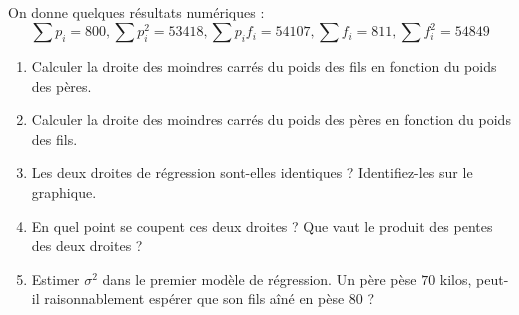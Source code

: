 \documentclass{../headers/td_upc}
\providecommand{\1}{\mathds{1}}
\begin{document}
	On donne quelques résultats numériques :
	$$
	\sum p_{i}=800, \sum p_{i}^{2}=53418, \sum p_{i} f_{i}=54107, \sum f_{i}=811, \sum f_{i}^{2}=54849
	$$
	\begin{enumerate}
		\item  Calculer la droite des moindres carrés du poids des fils en fonction du poids des pères.
		\cor{
		\[
		\hat \beta_1 
		= \frac{\sum_{i=1}^n (f_i - \bar{f})(p_i - \bar{p})}{\sum_{i=1}^n (p_i - \bar{p})^2}
		= \frac{\sum_{i = 1}^n f_ip_i - \frac{1}{n}(\sum_{i = 1}^np_i)(\sum_{i = 1}^nf_i)}{\sum_{i=1}^n p_i^2 - \frac{1}{n}(\sum_{i=1}^n p_i)^2}
		= \frac{54107 - 800 \times 811 / 12}{53418 - 800^2/12}
		= 0.476378
		\]
		\[
		\hat\beta_0 = \bar{f} - \hat\beta_1 \bar{p} = 811 / 12 - 0.476378 \times 800 / 12 = 35.8248
		\]
		}
		\item  Calculer la droite des moindres carrés du poids des pères en fonction du poids des fils.
				\cor{
		\[
		\hat \beta_1 
		= \frac{\sum_{i=1}^n (f_i - \bar{f})(p_i - \bar{p})}{\sum_{i=1}^n (f_i - \bar{f})^2}
		= \frac{\sum_{i = 1}^n f_ip_i - \frac{1}{n}(\sum_{i = 1}^np_i)(\sum_{i = 1}^nf_i)}{\sum_{i=1}^n f_i^2 - \frac{1}{n}(\sum_{i=1}^n f_i)^2}
		= \frac{54107 - 800 \times 811 / 12}{54849 - 811^2/12}
		= 1.036403
		\]
		\[
		\hat\beta_0 = \bar{p} - \hat\beta_1 \bar{f} = 800 / 12 - 0.476378 \times 811 / 12 = -3.376903
		\]
		}
		\item  Les deux droites de régression sont-elles identiques ? Identifiez-les sur le graphique.
		\item  En quel point se coupent ces deux droites ? Que vaut le produit des pentes des deux droites ?
		\item  Estimer $\sigma^{2}$ dans le premier modèle de régression.
		Un père pèse $70$ kilos, peut-il raisonnablement espérer que son fils aîné en pèse $80$ ?

\end{enumerate}
\end{document}
